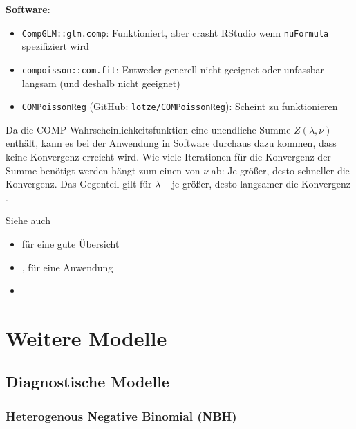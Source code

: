\documentclass[ngerman,a4paper,]{scrartcl}
\providecommand{\tightlist}{%
  \setlength{\itemsep}{0pt}\setlength{\parskip}{0pt}}
\theoremstyle{definition}
\theoremstyle{definition}
\theoremstyle{definition}
\theoremstyle{remark}
\begin{document}
\textbf{Software}:

\begin{itemize}
\tightlist
\item
  \texttt{CompGLM::glm.comp}: Funktioniert, aber crasht RStudio wenn \texttt{nuFormula} spezifiziert wird
\item
  \texttt{compoisson::com.fit}: Entweder generell nicht geeignet oder unfassbar langsam (und deshalb nicht geeignet)
\item
  \texttt{COMPoissonReg} (GitHub: \texttt{lotze/COMPoissonReg}): Scheint zu funktionieren
\end{itemize}

Da die COMP-Wahrscheinlichkeitsfunktion eine unendliche Summe \(Z(\lambda, \nu)\) enthält, kann es bei der Anwendung in Software durchaus dazu kommen, dass keine Konvergenz erreicht wird. Wie viele Iterationen für die Konvergenz der Summe benötigt werden hängt zum einen von \(\nu\) ab: Je größer, desto schneller die Konvergenz. Das Gegenteil gilt für \(\lambda\) -- je größer, desto langsamer die Konvergenz \citep[p.~4]{high2018AlternativeVariance}.

Siehe auch

\begin{itemize}
\tightlist
\item
  \citet{sellers2010FlexibleRegression} für eine gute Übersicht
\item
  \citet{lord2010ExtensionApplication}, \citet{lord2008ApplicationConwayMaxwellPoisson} für eine Anwendung
\item
  \citet{shmueli2005UsefulDistribution}
\end{itemize}

\hypertarget{weitere-modelle}{%
\section{Weitere Modelle}\label{weitere-modelle}}

\hypertarget{diagnostische-modelle}{%
\subsection{Diagnostische Modelle}\label{diagnostische-modelle}}

\hypertarget{mod-nbh}{%
\subsubsection{Heterogenous Negative Binomial (NBH)}\label{mod-nbh}}
\end{document}
